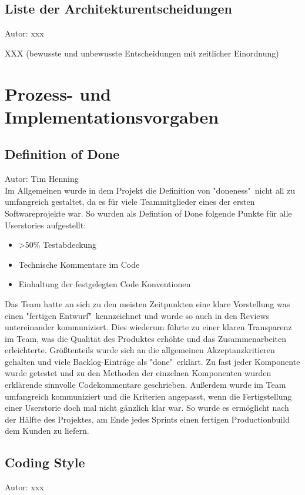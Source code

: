 \documentclass[twoside]{report}
\begin{document}
\subsection{Liste der Architekturentscheidungen}
{\small Autor: xxx}

XXX (bewusste und unbewusste Entscheidungen mit zeitlicher Einordnung)



\section{Prozess- und Implementationsvorgaben}

\subsection{Definition of Done}
{\small Autor: Tim Henning}
\\
Im Allgemeinen wurde in dem Projekt die Definition von "doneness"\ nicht all zu umfangreich 
gestaltet, da es für viele Teammitglieder eines der ersten Softwareprojekte war. So wurden als Defintion of Done folgende
Punkte für alle Userstories aufgestellt:
\begin{itemize}
  \item >50\% Testabdeckung
  \item Technische Kommentare im Code
  \item Einhaltung der festgelegten Code Konventionen
\end{itemize}
Das Team hatte an sich zu den meisten Zeitpunkten eine klare Vorstellung was einen "fertigen Entwurf"\ kennzeichnet und wurde so auch in den Reviews untereinander kommuniziert. 
Dies wiederum führte zu einer klaren Transparenz im Team, was die Qualität des Produktes erhöhte und das Zusammenarbeiten erleichterte.
Größtenteils wurde sich
an die allgemeinen Akzeptanzkritieren gehalten und viele Backlog-Einträge als "done"\ erklärt. Zu fast jeder Komponente wurde 
getestet und zu den Methoden der einzelnen Komponenten wurden erklärende sinnvolle Codekommentare geschrieben. 
Außerdem wurde im Team umfangreich kommuniziert und die Kriterien angepasst, wenn die Fertigstellung einer Userstorie doch mal nicht gänzlich klar war.
So wurde es ermöglicht nach der Hälfte des Projektes, am Ende jedes Sprints einen fertigen Productionbuild dem Kunden zu liefern.
  


\subsection{Coding Style}
{\small Autor: xxx}
\end{document}
